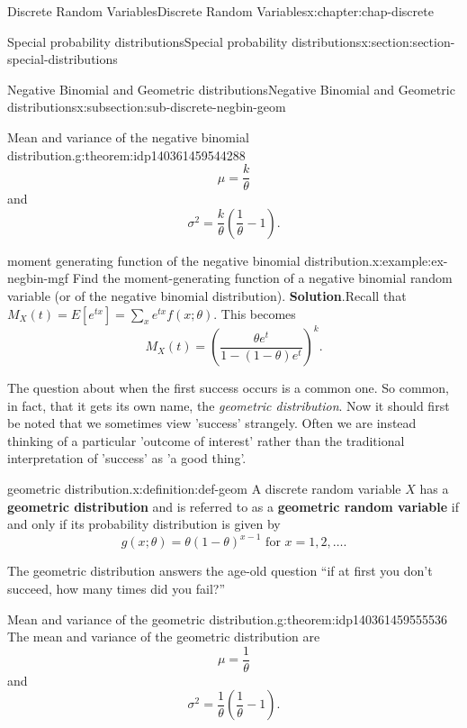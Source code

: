 \documentclass[oneside,10pt,]{book}
\newcommand{\blocktitlefont}{\relax}
\newcommand{\terminology}[1]{\textbf{#1}}
\numberwithin{equation}{section}
\begin{document}
\begin{chapterptx}{Discrete Random Variables}{}{Discrete Random Variables}{}{}{x:chapter:chap-discrete}
\begin{sectionptx}{Special probability distributions}{}{Special probability distributions}{}{}{x:section:section-special-distributions}
\begin{subsectionptx}{Negative Binomial and Geometric distributions}{}{Negative Binomial and Geometric distributions}{}{}{x:subsection:sub-discrete-negbin-geom}
\begin{theorem}{Mean and variance of the negative binomial distribution.}{}{g:theorem:idp140361459544288}
\begin{equation*}
\mu
= \frac{k}{\theta}
\end{equation*}
and%
\begin{equation*}
\sigma^2 =
\frac{k}{\theta}\left(\frac{1}{\theta}-1\right)\text{.}
\end{equation*}
%
\end{theorem}
\begin{example}{moment generating function of the negative binomial distribution.}{x:example:ex-negbin-mgf}%
Find the moment-generating function of a negative binomial random variable (or of the negative binomial distribution).%
\textbf{\blocktitlefont Solution}.\quad{}Recall that \(\displaystyle M_X(t) = E[e^{tx}] = \sum_x e^{tx} f(x;
\theta)\). This becomes%
\begin{equation*}
M_X(t) = \left(\dfrac{\theta e^t}{1-(1-\theta)e^t}\right)^k\text{.}
\end{equation*}
%
\end{example}
The question about when the first success occurs is a common one. So common, in fact, that it gets its own name, the \emph{geometric distribution}.  Now it should first be noted that we sometimes view 'success' strangely. Often we are instead thinking of a particular 'outcome of interest' rather than the traditional interpretation of 'success' as 'a good thing'.%
\begin{definition}{geometric distribution.}{x:definition:def-geom}%
A discrete random variable \(\displaystyle X\) has a \terminology{geometric distribution} and is referred to as a \terminology{geometric random variable} if and only if its probability distribution is given by%
\begin{equation*}
g(x; \theta) = \theta(1-\theta)^{x-1}
\text{ for }x = 1, 2, \dots\text{.}
\end{equation*}
%
\end{definition}
The geometric distribution answers the age-old question ``if at first you don't succeed, how many times did you fail?''%
\begin{theorem}{Mean and variance of the geometric distribution.}{}{g:theorem:idp140361459555536}%
The mean and variance of the geometric distribution are%
\begin{equation*}
\mu =
\frac{1}{\theta}
\end{equation*}
and%
\begin{equation*}
\sigma^2 =
\frac{1}{\theta}\left(\frac{1}{\theta}-1\right)\text{.}
\end{equation*}
%
\end{theorem}

\end{subsectionptx}
\end{sectionptx}
\end{chapterptx}
\end{document}
